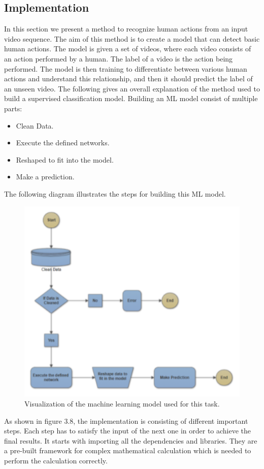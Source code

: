 \subsection{Implementation}
\hspace{5mm} In this section we present a method to recognize human actions from an input video sequence. The aim of this method is to create a model that can detect basic human actions. The model is given a set of videos, where each video consists of an action performed by a human. The label of a video is the action being performed. The model is then training to differentiate between various human actions and understand this relationship, and then it should predict the label of an unseen video. The following gives an overall explanation of the method used to build a supervised classification model. Building an ML model consist of multiple parts:
\begin{itemize}
\item Clean Data.
\item Execute the defined networks.
\item Reshaped to fit into the model. 
\item Make a prediction.
\end{itemize}

The following diagram illustrates the steps for building this ML model.\\
\begin{figure}[ht]
\centering
\includegraphics{Figures/m}
\decoRule
\caption[Visualization of the machine learning model used for this task.]{Visualization of the machine learning model used for this task.}
\label{fig:la}
\end{figure}
\newpage
As shown in figure 3.8, the implementation is consisting of different important steps. Each step has to satisfy the input of the next one in order to achieve the final results. It starts with importing all the dependencies and libraries. They are a pre-built framework for complex mathematical calculation which is needed to perform the calculation correctly.\\

